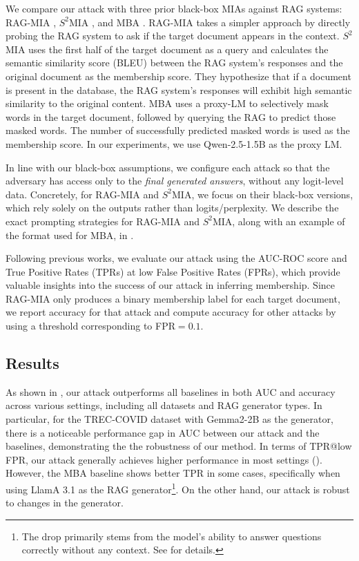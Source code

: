  We compare our attack with three prior black-box MIAs against RAG systems: RAG-MIA \citep{anderson2024my}, $S^2$MIA \citep{li2024generating}, and MBA \citep{liu2024mask}. RAG-MIA takes a simpler approach by directly probing the RAG system to ask if the target document appears in the context. $S^2$MIA uses the first half of the target document as a query and calculates the semantic similarity score (\ie BLEU) between the RAG system's responses and the original document as the membership score. They hypothesize that if a document is present in the database, the RAG system's responses will exhibit high semantic similarity to the original content. MBA uses a proxy-LM to selectively mask words in the target document, followed by querying the RAG to predict those masked words. The number of successfully predicted masked words is used as the membership score. In our experiments, we use Qwen-2.5-1.5B \citep{yang2024qwen2} as the proxy LM.  

In line with our black-box assumptions, we configure each attack so that the adversary has access only to the \emph{final generated answers}, without any logit-level data. Concretely, for RAG-MIA and $S^2$MIA, we focus on their black-box versions, which rely solely on the outputs rather than logits/perplexity. We describe the exact prompting strategies for RAG-MIA and  $S^2$MIA, along with an example of the format used for MBA, in .

 Following previous works, we evaluate our attack using the AUC-ROC score and True Positive Rates (TPRs) at low False Positive Rates (FPRs), which provide valuable insights into the success of our attack in inferring membership. Since RAG-MIA only produces a binary membership label for each target document, we report accuracy for that attack and compute accuracy for other attacks by using a threshold corresponding to FPR$=0.1$.


\subsection{Results}
\label{sec:main_results}

As shown in , our attack outperforms all baselines in both AUC and accuracy across various settings, including all datasets and RAG generator types. In particular, for the TREC-COVID dataset with Gemma2-2B as the generator, there is a noticeable performance gap in AUC between our attack and the baselines, demonstrating the the robustness of our method. In terms of TPR@low FPR, our attack generally achieves higher performance in most settings (). 
However, the MBA baseline shows better TPR in some cases, specifically when using LlamA 3.1 as the RAG generator\footnote{The drop primarily stems from the model's ability to answer questions correctly without any context. See  for details.}. On the other hand, our attack is robust to changes in the generator.

